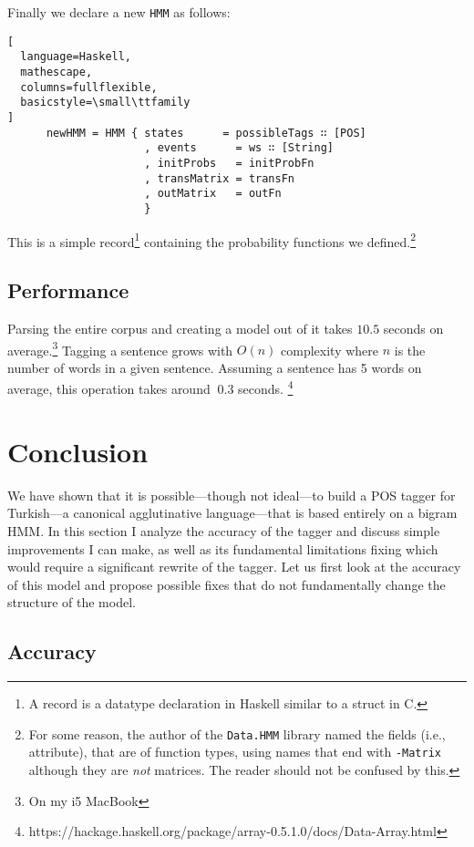 \documentclass{article}
\begin{document}
Finally we declare a new \texttt{HMM} as follows:
\newpage
\begin{lstlisting}[
  language=Haskell,
  mathescape,
  columns=fullflexible,
  basicstyle=\small\ttfamily
]
      newHMM = HMM { states      = possibleTags ∷ [POS]
                     , events      = ws ∷ [String]
                     , initProbs   = initProbFn
                     , transMatrix = transFn
                     , outMatrix   = outFn
                     }
\end{lstlisting}

This is a simple record\footnote{A record is a datatype declaration in Haskell
  similar to a struct in C.} containing the probability functions we
defined.\footnote{For some reason, the author of the \texttt{Data.HMM} library
  named the fields (i.e., attribute), that are of function types, using names
  that end with \texttt{-Matrix} although they are \emph{not} matrices. The
  reader should not be confused by this.}



\subsection{Performance}
Parsing the entire corpus and creating a model out of it takes $10.5$ seconds on
average.\footnote{On my i5 MacBook} Tagging a sentence grows with $O(n)$
complexity where $n$ is the number of words in a given sentence. Assuming a
sentence has 5 words on average, this operation takes around $~0.3$ seconds.
\footnote{https://hackage.haskell.org/package/array-0.5.1.0/docs/Data-Array.html}

\section{Conclusion}

We have shown that it is possible---though not ideal---to build a POS tagger for
Turkish---a canonical agglutinative language---that is based entirely on a
bigram HMM. In this section I analyze the accuracy of the tagger and discuss
simple improvements I can make, as well as its fundamental limitations fixing
which would require a significant rewrite of the tagger. Let us first look at
the accuracy of this model and propose possible fixes that do not fundamentally
change the structure of the model.

\subsection{Accuracy}
\label{subsec:accuracy}
\end{document}
